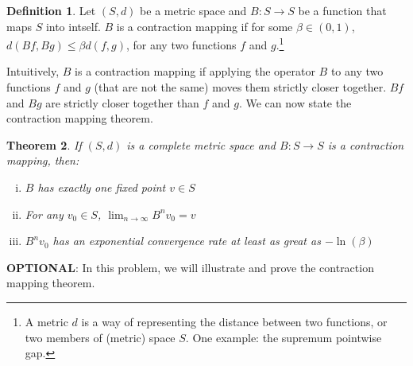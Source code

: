 \documentclass[11pt]{extarticle}
\theoremstyle{plain}
\newtheorem{thm}{Theorem}
\theoremstyle{definition}
\newtheorem{defn}[thm]{Definition}
\begin{document}
\vspace{5mm}
\begin{defn}
	
	Let $(S, d)$ be a metric space and $B: S \to S$ be a function that maps $S$ into intself. $B$ is a contraction mapping if for some $\beta \in (0, 1)$, $d(Bf, Bg) \leq \beta d(f, g)$, for any two functions $f$ and $g$.\footnote{
		A metric $d$ is a way of representing the distance between two functions, or two members of (metric) space $S$. One example: the supremum pointwise gap.
	}
	
\end{defn}


\vspace{5mm}
\noindent
Intuitively, $B$ is a contraction mapping if applying the operator $B$ to any two functions $f$ and $g$ (that are not the same) moves them strictly closer together. $Bf$ and $Bg$ are strictly closer together than $f$ and $g$. We can now state the contraction mapping theorem. 


\vspace{5mm}
\begin{thm}
	

	If $(S, d)$ is a complete metric space and $B: S \to S$ is a contraction mapping, then: 
	\begin{enumerate}[(i)]
		\item $B$ has exactly one fixed point $v \in S$
		\item For any $v_0 \in S$, $\lim_{n \to \infty} B^n v_0 = v$
		\item $B^n v_0$ has an exponential convergence rate at least as great as $- \ln(\beta)$
	\end{enumerate}
	
\end{thm}


\vspace{10mm}
\noindent
\textbf{OPTIONAL}: In this problem, we will illustrate and prove the contraction mapping theorem.
\end{document}
